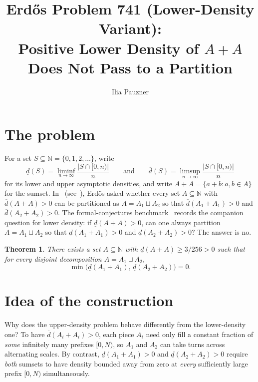 \documentclass[11pt,a4paper]{amsart}
\title[Erd\H{o}s Problem 741 (Lower-Density Variant)]{\texorpdfstring{Erd\H{o}s Problem 741 (Lower-Density Variant):\\ Positive Lower Density of $A + A$ Does Not Pass to a Partition}{Erdos Problem 741 (Lower-Density Variant): Positive Lower Density of A + A Does Not Pass to a Partition}}
\author{Ilia Pauzner}
\date{}
\newtheorem*{theorem}{Theorem}
\theoremstyle{remark}
\newcommand{\ld}{\underline{d}}
\newcommand{\ud}{\overline{d}}
\begin{document}
\maketitle

\section{The problem}

For a set $S \subseteq \mathbb{N} = \{0, 1, 2, \dots\}$, write
\[
\ld(S) = \liminf_{n \to \infty} \frac{|S \cap [0, n)|}{n}
\qquad\text{and}\qquad
\ud(S) = \limsup_{n \to \infty} \frac{|S \cap [0, n)|}{n}
\]
for its lower and upper asymptotic densities, and write $A + A = \{a + b : a, b \in A\}$ for the sumset. In~\cite{Er94b} (see~\cite{EP741}), Erd\H{o}s asked whether every set $A \subseteq \mathbb{N}$ with $\ud(A + A) > 0$ can be partitioned as $A = A_1 \sqcup A_2$ so that $\ud(A_1 + A_1) > 0$ and $\ud(A_2 + A_2) > 0$. The formal-conjectures benchmark~\cite{FC741} records the companion question for lower density: if $\ld(A + A) > 0$, can one always partition $A = A_1 \sqcup A_2$ so that $\ld(A_1 + A_1) > 0$ and $\ld(A_2 + A_2) > 0$? The answer is no.

\begin{theorem}
There exists a set $A \subseteq \mathbb{N}$ with $\ld(A + A) \ge 3 / 256 > 0$ such that for every disjoint decomposition $A = A_1 \sqcup A_2$,
\[
\min\bigl(\ld(A_1 + A_1),\, \ld(A_2 + A_2)\bigr) = 0.
\]
\end{theorem}

\section{Idea of the construction}

Why does the upper-density problem behave differently from the lower-density one? To have $\ud(A_i + A_i) > 0$, each piece $A_i$ need only fill a constant fraction of \emph{some} infinitely many prefixes $[0, N)$, so $A_1$ and $A_2$ can take turns across alternating scales. By contrast, $\ld(A_1 + A_1) > 0$ and $\ld(A_2 + A_2) > 0$ require \emph{both} sumsets to have density bounded away from zero at \emph{every} sufficiently large prefix $[0, N)$ simultaneously.
\end{document}
